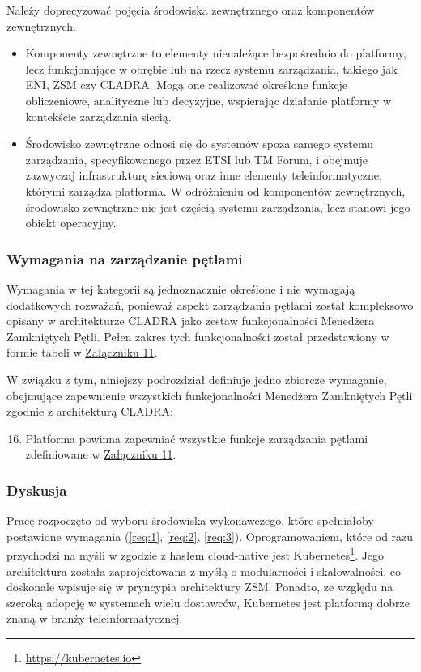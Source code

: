 Należy doprecyzować pojęcia środowiska zewnętrznego oraz komponentów zewnętrznych.
\begin{itemize}
    \item Komponenty zewnętrzne to elementy nienależące bezpośrednio do platformy, lecz funkcjonujące w obrębie lub na rzecz systemu zarządzania, takiego jak ENI, ZSM czy CLADRA. Mogą one realizować określone funkcje obliczeniowe, analityczne lub decyzyjne, wspierając działanie platformy w kontekście zarządzania siecią.
    \item Środowisko zewnętrzne odnosi się do systemów spoza samego systemu zarządzania, specyfikowanego przez ETSI lub TM Forum, i obejmuje zazwyczaj infrastrukturę sieciową oraz inne elementy teleinformatyczne, którymi zarządza platforma. W odróżnieniu od komponentów zewnętrznych, środowisko zewnętrzne nie jest częścią systemu zarządzania, lecz stanowi jego obiekt operacyjny.
\end{itemize}

\subsubsection{Wymagania na zarządzanie pętlami}

Wymagania w tej kategorii są jednoznacznie określone i nie wymagają dodatkowych rozważań, ponieważ aspekt zarządzania pętlami został kompleksowo opisany w architekturze CLADRA jako zestaw funkcjonalności Menedżera Zamkniętych Pętli. Pełen zakres tych funkcjonalności został przedstawiony w formie tabeli w \hyperlink{appendix:11}{Załączniku 11}.

W związku z tym, niniejszy podrozdział definiuje jedno zbiorcze wymaganie, obejmujące zapewnienie wszystkich funkcjonalności Menedżera Zamkniętych Pętli zgodnie z architekturą CLADRA:

\begin{enumerate}
    \setcounter{enumi}{15} 
    \item \label{req:16} Platforma powinna zapewniać wszystkie funkcje zarządzania pętlami zdefiniowane w \hyperlink{appendix:11}{Załączniku 11}.
\end{enumerate}

\subsubsection{Dyskusja}

Pracę rozpoczęto od wyboru środowiska wykonawczego, które spełniałoby postawione wymagania (\ref{req:1}, \ref{req:2}, \ref{req:3}). Oprogramowaniem, które od razu przychodzi na myśli w zgodzie z hasłem cloud-native jest Kubernetes\footnote{\url{https://kubernetes.io}}. Jego architektura została zaprojektowana z myślą o modularności i skalowalności, co doskonale wpisuje się w pryncypia architektury ZSM. Ponadto, ze względu na szeroką adopcję w systemach wielu dostawców, Kubernetes jest platformą dobrze znaną w branży teleinformatycznej. 

